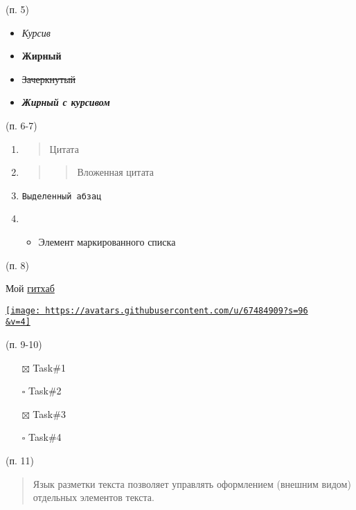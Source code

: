 (п. 5)

\begin{itemize}
\tightlist
\item
  \emph{Курсив}
\item
  \textbf{Жирный}
\item
  \sout{Зачеркнутый}
\item
  \textbf{\emph{Жирный с курсивом}}
\end{itemize}

(п. 6-7)

\begin{enumerate}
\def\labelenumi{\arabic{enumi}.}
\item
  \begin{quote}
  Цитата
  \end{quote}
\item
  \begin{quote}
  \begin{quote}
  Вложенная цитата
  \end{quote}
  \end{quote}
\item
\begin{verbatim}
Выделенный абзац
\end{verbatim}
\item
  \begin{itemize}
  \tightlist
  \item
    Элемент маркированного списка
  \end{itemize}
\end{enumerate}

(п. 8)

Мой \href{https://github.com/nikyoff}{гитхаб}

\href{https://github.com/nikyoff}{\texttt{[image: https://avatars.githubusercontent.com/u/67484909?s=96\\\&v=4]}}

(п. 9-10)

\begin{itemize}
\tightlist
\item[$\boxtimes$]
  Task\#1
\item[$\square$]
  Task\#2
\item[$\boxtimes$]
  Task\#3
\item[$\square$]
  Task\#4
\end{itemize}

(п. 11)

\begin{quote}
Язык разметки текста позволяет управлять оформлением (внешним видом)
отдельных элементов текста.
\end{quote}

